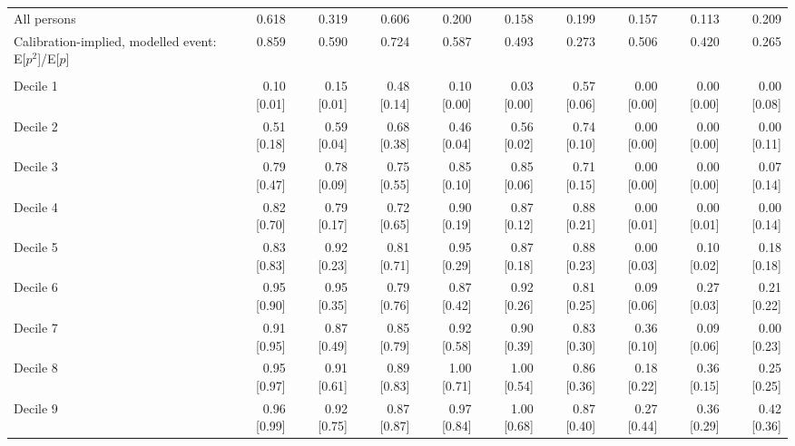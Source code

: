 \begin{table}[H]
{\begin{tabular}[t]{lrrrrrrrrr}
\hspace{1em}All persons & 0.618 & 0.319 & 0.606 & 0.200 & 0.158 & 0.199 & 0.157 & 0.113 & 0.209\\
\hspace{1em}Calibration-implied, modelled event: E[$p^2$]/E[$p$] & 0.859 & 0.590 & 0.724 & 0.587 & 0.493 & 0.273 & 0.506 & 0.420 & 0.265\\
\addlinespace[0.3em]
\multicolumn{10}{l}{\textit{Panel D. Share documented Black alone, non-Hispanic [mean $p$] by decile of $p$ (head coaches: documented-positive lower bounds)}}\\
\hspace{1em}Decile 1 & 0.10 [0.01] & 0.15 [0.01] & 0.48 [0.14] & 0.10 [0.00] & 0.03 [0.00] & 0.57 [0.06] & 0.00 [0.00] & 0.00 [0.00] & 0.00 [0.08]\\
\hspace{1em}Decile 2 & 0.51 [0.18] & 0.59 [0.04] & 0.68 [0.38] & 0.46 [0.04] & 0.56 [0.02] & 0.74 [0.10] & 0.00 [0.00] & 0.00 [0.00] & 0.00 [0.11]\\
\hspace{1em}Decile 3 & 0.79 [0.47] & 0.78 [0.09] & 0.75 [0.55] & 0.85 [0.10] & 0.85 [0.06] & 0.71 [0.15] & 0.00 [0.00] & 0.00 [0.00] & 0.07 [0.14]\\
\hspace{1em}Decile 4 & 0.82 [0.70] & 0.79 [0.17] & 0.72 [0.65] & 0.90 [0.19] & 0.87 [0.12] & 0.88 [0.21] & 0.00 [0.01] & 0.00 [0.01] & 0.00 [0.14]\\
\hspace{1em}Decile 5 & 0.83 [0.83] & 0.92 [0.23] & 0.81 [0.71] & 0.95 [0.29] & 0.87 [0.18] & 0.88 [0.23] & 0.00 [0.03] & 0.10 [0.02] & 0.18 [0.18]\\
\hspace{1em}Decile 6 & 0.95 [0.90] & 0.95 [0.35] & 0.79 [0.76] & 0.87 [0.42] & 0.92 [0.26] & 0.81 [0.25] & 0.09 [0.06] & 0.27 [0.03] & 0.21 [0.22]\\
\hspace{1em}Decile 7 & 0.91 [0.95] & 0.87 [0.49] & 0.85 [0.79] & 0.92 [0.58] & 0.90 [0.39] & 0.83 [0.30] & 0.36 [0.10] & 0.09 [0.06] & 0.00 [0.23]\\
\hspace{1em}Decile 8 & 0.95 [0.97] & 0.91 [0.61] & 0.89 [0.83] & 1.00 [0.71] & 1.00 [0.54] & 0.86 [0.36] & 0.18 [0.22] & 0.36 [0.15] & 0.25 [0.25]\\
\hspace{1em}Decile 9 & 0.96 [0.99] & 0.92 [0.75] & 0.87 [0.87] & 0.97 [0.84] & 1.00 [0.68] & 0.87 [0.40] & 0.27 [0.44] & 0.36 [0.29] & 0.42 [0.36]\\

\end{tabular}}
\end{table}

